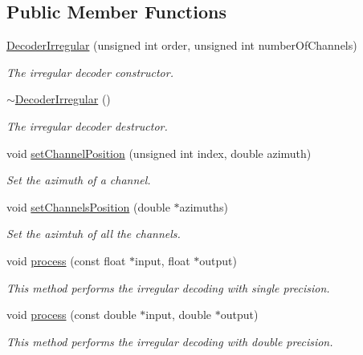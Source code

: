 \subsection*{Public Member Functions}
\begin{DoxyCompactItemize}
\item 
\hyperlink{class_hoa2_d_1_1_decoder_irregular_a6847d61194817c336f323f21b757a67a}{Decoder\-Irregular} (unsigned int order, unsigned int number\-Of\-Channels)
\begin{DoxyCompactList}\small\item\em The irregular decoder constructor. \end{DoxyCompactList}\item 
\hyperlink{class_hoa2_d_1_1_decoder_irregular_af8a618d1d04c00f33c360fde6d09e03f}{$\sim$\-Decoder\-Irregular} ()
\begin{DoxyCompactList}\small\item\em The irregular decoder destructor. \end{DoxyCompactList}\item 
void \hyperlink{class_hoa2_d_1_1_decoder_irregular_ab74543528e37f6455de5452f00ac7c1c}{set\-Channel\-Position} (unsigned int index, double azimuth)
\begin{DoxyCompactList}\small\item\em Set the azimuth of a channel. \end{DoxyCompactList}\item 
void \hyperlink{class_hoa2_d_1_1_decoder_irregular_a6c4b42a6c7f9030b4db0d53186a9d6e0}{set\-Channels\-Position} (double $\ast$azimuths)
\begin{DoxyCompactList}\small\item\em Set the azimtuh of all the channels. \end{DoxyCompactList}\item 
void \hyperlink{class_hoa2_d_1_1_decoder_irregular_aacb9c2de89e276d0ede87e2ecfd2bde4}{process} (const float $\ast$input, float $\ast$output)
\begin{DoxyCompactList}\small\item\em This method performs the irregular decoding with single precision. \end{DoxyCompactList}\item 
void \hyperlink{class_hoa2_d_1_1_decoder_irregular_aa94b51fed5c341c0980d0d0ba9c53414}{process} (const double $\ast$input, double $\ast$output)
\begin{DoxyCompactList}\small\item\em This method performs the irregular decoding with double precision. \end{DoxyCompactList}\end{DoxyCompactItemize}
